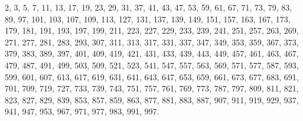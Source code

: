 \documentclass[a4paper,12pt]{article}
\begin{document}
\medskip



2, 3, 5, 7, 11, 13, 17, 19, 23, 29, 31, 37, 41, 43, 47, 53, 59, 61, 67, 71, 73, 79, 83, 89, 97,
101, 103, 107, 109, 113, 127, 131, 137, 139, 149, 151, 157, 163, 167, 173, 179, 181, 191, 193, 197,
199, 211, 223, 227, 229, 233, 239, 241, 251, 257, 263, 269, 271, 277, 281, 283, 293, 307, 311, 313,
317, 331, 337, 347, 349, 353, 359, 367, 373, 379, 383, 389, 397, 401, 409, 419, 421, 431, 433, 439,
443, 449, 457, 461, 463, 467, 479, 487, 491, 499, 503, 509, 521, 523, 541, 547, 557, 563, 569, 571,
577, 587, 593, 599, 601, 607, 613, 617, 619, 631, 641, 643, 647, 653, 659, 661, 673, 677, 683, 691,
701, 709, 719, 727, 733, 739, 743, 751, 757, 761, 769, 773, 787, 797, 809, 811, 821, 823, 827, 829,
839, 853, 857, 859, 863, 877, 881, 883, 887, 907, 911, 919, 929, 937, 941, 947, 953, 967, 971, 977,
983, 991, 997.
\end{document}
